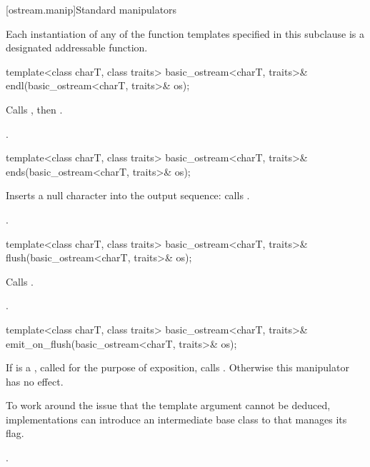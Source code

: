 [ostream.manip]{Standard manipulators}

\pnum
Each instantiation of any of the function templates
specified in this subclause
is a designated addressable function.

%
\begin{itemdecl}
template<class charT, class traits>
  basic_ostream<charT, traits>& endl(basic_ostream<charT, traits>& os);
\end{itemdecl}

\begin{itemdescr}
\pnum
\effects
Calls
,
then
.

\pnum
\returns
{}.
\end{itemdescr}

%
\begin{itemdecl}
template<class charT, class traits>
  basic_ostream<charT, traits>& ends(basic_ostream<charT, traits>& os);
\end{itemdecl}

\begin{itemdescr}
\pnum
\effects
Inserts a null character into the output sequence:
calls
.

\pnum
\returns
{}.
\end{itemdescr}

%
\begin{itemdecl}
template<class charT, class traits>
  basic_ostream<charT, traits>& flush(basic_ostream<charT, traits>& os);
\end{itemdecl}

\begin{itemdescr}
\pnum
\effects
Calls
.

\pnum
\returns
{}.
\end{itemdescr}

%
\begin{itemdecl}
template<class charT, class traits>
  basic_ostream<charT, traits>& emit_on_flush(basic_ostream<charT, traits>& os);
\end{itemdecl}

\begin{itemdescr}
\pnum
\effects
If  is a
,
called  for the purpose of exposition,
calls .
Otherwise this manipulator has no effect.
\begin{note}
To work around the issue that the
 template argument cannot be deduced,
implementations can introduce an intermediate base class
to  that manages its  flag.
\end{note}

\pnum
\returns
{}.
\end{itemdescr}

